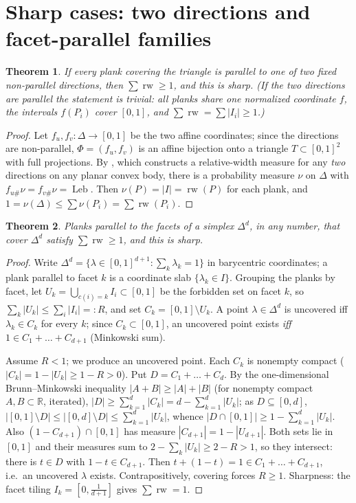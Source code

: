 \documentclass[11pt,reqno]{amsart}
\theoremstyle{plain}
\newtheorem{theorem}{Theorem}[section]
\theoremstyle{definition}
\theoremstyle{remark}
\newcommand{\rw}{\operatorname{rw}}
\newcommand{\Leb}{\operatorname{Leb}}
\newcommand{\R}{\mathbb{R}}
\begin{document}
\section{Sharp cases: two directions and facet-parallel families}\label{sec:sharp}
\begin{theorem}\label{thm:twodir}
If every plank covering the triangle is parallel to one of two fixed
\emph{non-parallel} directions, then $\sum\rw\ge1$, and this is sharp. (If the two
directions are parallel the statement is trivial: all planks share one normalized
coordinate $f$, the intervals $f(P_i)$ cover $[0,1]$, and $\sum\rw=\sum|I_i|\ge1$.)
\end{theorem}
\begin{proof}
Let $f_u,f_v:\Delta\to[0,1]$ be the two affine coordinates; since the directions are
non-parallel, $\Phi=(f_u,f_v)$ is an
affine bijection onto a triangle $T\subset[0,1]^2$ with full projections. By
\cite[Theorem~1]{Gardner88}, which constructs a relative-width measure for any
\emph{two} directions on any planar convex body,
there is a probability measure $\nu$ on $\Delta$ with $f_{u\#}\nu=f_{v\#}\nu=\Leb$.
Then $\nu(P)=|I|=\rw(P)$ for each plank, and
$1=\nu(\Delta)\le\sum\nu(P_i)=\sum\rw(P_i)$.
\end{proof}
\begin{theorem}\label{thm:facet}
Planks parallel to the facets of a simplex $\Delta^d$, in any number, that cover
$\Delta^d$ satisfy $\sum\rw\ge1$, and this is sharp.
\end{theorem}
\begin{proof}
Write $\Delta^d=\{\lambda\in[0,1]^{d+1}:\sum_k\lambda_k=1\}$ in barycentric
coordinates; a plank parallel to facet $k$ is a coordinate slab
$\{\lambda_k\in I\}$. Grouping the planks by facet, let
$U_k=\bigcup_{c(i)=k}I_i\subset[0,1]$ be the forbidden set on facet $k$, so
$\sum_k|U_k|\le\sum_i|I_i|=:R$, and set $C_k=[0,1]\setminus U_k$. A point
$\lambda\in\Delta^d$ is uncovered iff $\lambda_k\in C_k$ for every $k$; since
$C_k\subset[0,1]$, an uncovered point exists \emph{iff}
$1\in C_1+\dots+C_{d+1}$ (Minkowski sum).

Assume $R<1$; we produce an uncovered point. Each $C_k$ is nonempty compact
($|C_k|=1-|U_k|\ge1-R>0$). Put $D=C_1+\dots+C_d$. By the one-dimensional
Brunn--Minkowski inequality $|A+B|\ge|A|+|B|$ (for nonempty compact $A,B\subset\R$,
iterated), $|D|\ge\sum_{k=1}^d|C_k|=d-\sum_{k=1}^d|U_k|$; as $D\subseteq[0,d]$,
$|[0,1]\setminus D|\le|[0,d]\setminus D|\le\sum_{k=1}^d|U_k|$, whence
$|D\cap[0,1]|\ge1-\sum_{k=1}^d|U_k|$. Also $(1-C_{d+1})\cap[0,1]$ has measure
$|C_{d+1}|=1-|U_{d+1}|$. Both sets lie in $[0,1]$ and their measures sum to
$2-\sum_k|U_k|\ge2-R>1$, so they intersect: there is $t\in D$ with $1-t\in C_{d+1}$.
Then $t+(1-t)=1\in C_1+\dots+C_{d+1}$, i.e.\ an uncovered $\lambda$ exists.
Contrapositively, covering forces $R\ge1$. Sharpness: the facet tiling
$I_k=[0,\tfrac1{d+1}]$ gives $\sum\rw=1$.
\end{proof}
\end{document}
